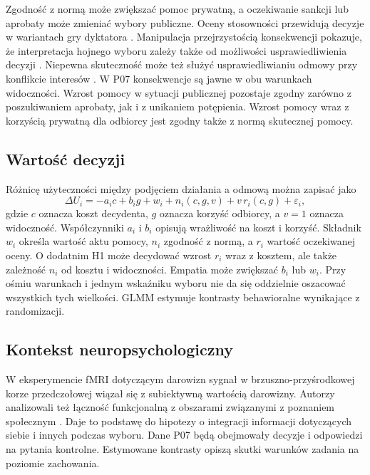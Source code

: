 \documentclass[11pt,a4paper]{article}
\begin{document}
Zgodność z normą może zwiększać pomoc prywatną, a oczekiwanie sankcji lub aprobaty może zmieniać wybory publiczne. Oceny stosowności przewidują decyzje w wariantach gry dyktatora \citep{krupka2013}. Manipulacja przejrzystością konsekwencji pokazuje, że interpretacja hojnego wyboru zależy także od możliwości usprawiedliwienia decyzji \citep{dana2007}. Niepewna skuteczność może też służyć usprawiedliwianiu odmowy przy konflikcie interesów \citep{exley2016}. W P07 konsekwencje są jawne w obu warunkach widoczności. Wzrost pomocy w sytuacji publicznej pozostaje zgodny zarówno z poszukiwaniem aprobaty, jak i z unikaniem potępienia. Wzrost pomocy wraz z korzyścią prywatną dla odbiorcy jest zgodny także z normą skutecznej pomocy.

\subsection{Wartość decyzji}
Różnicę użyteczności między podjęciem działania a odmową można zapisać jako
\[
\Delta U_i=-a_i c+b_i g+w_i+n_i(c,g,v)+v\,r_i(c,g)+\varepsilon_i,
\]
gdzie $c$ oznacza koszt decydenta, $g$ oznacza korzyść odbiorcy, a $v=1$ oznacza widoczność. Współczynniki $a_i$ i $b_i$ opisują wrażliwość na koszt i korzyść. Składnik $w_i$ określa wartość aktu pomocy, $n_i$ zgodność z normą, a $r_i$ wartość oczekiwanej oceny. O dodatnim H1 może decydować wzrost $r_i$ wraz z kosztem, ale także zależność $n_i$ od kosztu i widoczności. Empatia może zwiększać $b_i$ lub $w_i$. Przy ośmiu warunkach i jednym wskaźniku wyboru nie da się oddzielnie oszacować wszystkich tych wielkości. GLMM estymuje kontrasty behawioralne wynikające z randomizacji.

\subsection{Kontekst neuropsychologiczny}
W eksperymencie fMRI dotyczącym darowizn sygnał w brzuszno-przyśrodkowej korze przedczołowej wiązał się z subiektywną wartością darowizny. Autorzy analizowali też łączność funkcjonalną z obszarami związanymi z poznaniem społecznym \citep{hare2010}. Daje to podstawę do hipotezy o integracji informacji dotyczących siebie i innych podczas wyboru. Dane P07 będą obejmowały decyzje i odpowiedzi na pytania kontrolne. Estymowane kontrasty opiszą skutki warunków zadania na poziomie zachowania.
\end{document}
